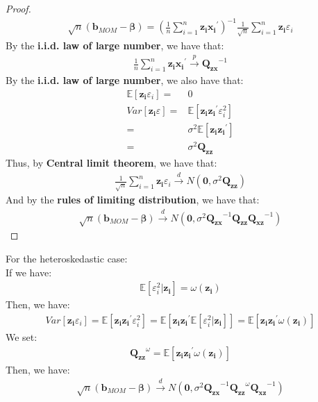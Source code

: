 \documentclass{article}
\begin{document}
	\begin{proof}
			\begin{align*}
				\sqrt{n}(\boldsymbol{b}_{MOM} - \boldsymbol{\beta}) = \left( \frac{1}{n}\sum^n_{i=1} \boldsymbol{z_i}\boldsymbol{x_i}^\prime \right)^{-1} \frac{1}{\sqrt{n}} \sum^n_{i=1} \boldsymbol{z_i}\varepsilon_i
			\end{align*}
			By the \textbf{i.i.d. law of large number}, we have that:
				\begin{align*}
					\frac{1}{n}\sum^n_{i=1} \boldsymbol{z_i}\boldsymbol{x_i}^\prime \xrightarrow{p} \boldsymbol{Q_{zx}}^{-1}
				\end{align*}		
			By the \textbf{i.i.d. law of large number}, we also have that:
				\begin{align*}
					\mathbb{E} [\boldsymbol{z_i}\varepsilon_i] = &0\\
					Var[\boldsymbol{z_i} \varepsilon] = &\mathbb{E}[\boldsymbol{z_i}\boldsymbol{z_i}^\prime \varepsilon^2_i]\\ = &
					\sigma^2 \mathbb{E}[\boldsymbol{z_i} \boldsymbol{z_i}^\prime]\\ = &
					\sigma^2 \boldsymbol{Q_{zz}}
				\end{align*}
			Thus, by \textbf{Central limit theorem}, we have that:
				\begin{align*}
					\frac{1}{\sqrt{n}} \sum^n_{i=1} \boldsymbol{z_i}\varepsilon_i \xrightarrow{d} N(\boldsymbol{0}, \sigma^2 \boldsymbol{Q_{zz}})
				\end{align*}	
			And by the \textbf{rules of limiting distribution}, we have that:
				\begin{align*}
					\sqrt{n}(\boldsymbol{b}_{MOM} - \boldsymbol{\beta}) \xrightarrow{d} N(\boldsymbol{0}, \sigma^2 \boldsymbol{Q_{zx}}^{-1} \boldsymbol{Q_{zz}} \boldsymbol{Q_{xz}}^{-1})
				\end{align*}
	\end{proof}
\noindent For the heteroskedastic case:\\
If we have:
	\begin{align*}
		\mathbb{E}[\varepsilon^2_i | \boldsymbol{z_i}] = \omega(\boldsymbol{z_i})
	\end{align*}
Then, we have:
	\begin{align*}
		Var[\boldsymbol{z_i}\varepsilon_i] = \mathbb{E}[\boldsymbol{z_i}\boldsymbol{z_i}^\prime \varepsilon^2_i] = \mathbb{E}[\boldsymbol{z_i}\boldsymbol{z_i}^\prime \mathbb{E}[\varepsilon^2_i | \boldsymbol{z_i}]] = \mathbb{E}[\boldsymbol{z_i}\boldsymbol{z_i}^\prime \omega(\boldsymbol{z_i})]
	\end{align*}
We set:
	\begin{align*}
		\boldsymbol{Q_{zz}}^{\omega} = \mathbb{E}[\boldsymbol{z_i}\boldsymbol{z_i}^\prime \omega(\boldsymbol{z_i})]
	\end{align*}
Then, we have:
	\begin{align*}
		\sqrt{n}(\boldsymbol{b}_{MOM} - \boldsymbol{\beta}) \xrightarrow{d} N(\boldsymbol{0}, \sigma^2 \boldsymbol{Q_{zx}}^{-1} \boldsymbol{Q_{zz}}^{\omega} \boldsymbol{Q_{xz}}^{-1})
	\end{align*}
\end{document}
